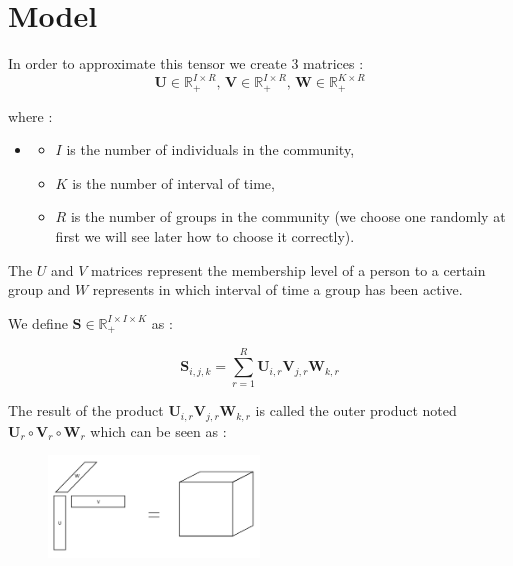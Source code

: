 \documentclass{article}
\begin{document}
\section{Model}

In order to approximate this tensor we create 3 matrices :
\[
    \mathbf{U} \in \mathbb{R}_+^{I \times R}, \,
    \mathbf{V} \in \mathbb{R}_+^{I \times R}, \,
    \mathbf{W} \in \mathbb{R}_+^{K \times R}
\]

where :
\begin{itemize}
    \item[]
    \begin{itemize}
        \item $I$ is the number of individuals in the community,
        \item $K$ is the number of interval of time,
        \item $R$ is the number of groups in the community (we choose one randomly at first we will see later how to choose it correctly).
    \end{itemize}
\end{itemize}

The $U$ and $V$ matrices represent the membership level of a person to a certain group
and $W$ represents in which interval of time a group has been active.




We define $\mathbf{S} \in \mathbb{R}_+^{I \times I \times K}$ as :

\[
    \mathbf{S}_{i,j,k} = \sum_{r = 1}^R \mathbf{U}_{i,r}\mathbf{V}_{j,r}\mathbf{W}_{k, r}
\]

The result of the product $\mathbf{U}_{i,r}\mathbf{V}_{j,r}\mathbf{W}_{k, r}$ is called the outer product noted $\mathbf{U}_r \circ \mathbf{V}_r \circ \mathbf{W}_r$ which can be seen as :

\begin{figure}[h]
    \centering
    \includegraphics[width=0.5\textwidth]{images/outer_product.png}
\end{figure}
\end{document}

